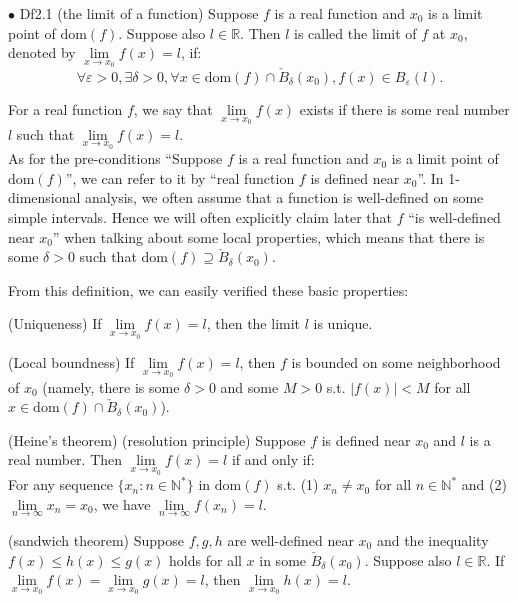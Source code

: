 \documentclass{article}
\begin{document}
\begin{Df}{$\bullet$ Df2.1 (the limit of a function)}
    Suppose $f$ is a real function and $x_0$ is a limit point of $\text{dom}(f)$. Suppose also $l\in\mathbb{R}$. Then $l$ is called the limit of $f$ at $x_0$, denoted by $\lim\limits_{x\rightarrow x_0}f(x) = l$, if:
    $$\forall\varepsilon>0, \exists\delta>0, \forall x\in\text{dom}(f)\cap\check{B}_\delta(x_0), f(x)\in B_\varepsilon(l).$$
\end{Df}

\begin{Rmk}{}
    \textcolor{Df}{For a real function $f$, we say that $\lim\limits_{x\to x_0} f(x)$ exists if there is some real number $l$ such that $\lim\limits_{x\to x_0} f(x) = l$.}\\
    \textcolor{Df}{As for the pre-conditions ``Suppose $f$ is a real function and $x_0$ is a limit point of $\text{dom}(f)$'', we can refer to it by ``real function $f$ is defined near $x_0$''.} In 1-dimensional analysis, we often assume that a function is well-defined on some simple intervals. \textcolor{Df}{Hence we will often explicitly claim later that $f$ ``is well-defined near $x_0$'' when talking about some local properties, which means that there is some $\delta>0$ such that $\text{dom}(f)\supseteq \check{B}_\delta(x_0)$.}\\
    \textcolor{Th}{From this definition, we can easily verified these basic properties:
    \begin{compactenum}
        \item (Uniqueness) If $\lim\limits_{x\rightarrow x_0}f(x) = l$, then the limit $l$ is unique.
        \item (Local boundness) If $\lim\limits_{x\rightarrow x_0}f(x) = l$, then $f$ is bounded on some neighborhood of $x_0$ (namely, there is some $\delta>0$ and some $M>0$ s.t. $|f(x)|<M$ for all $x\in\text{dom}(f)\cap\check{B}_\delta(x_0)$).
        \item (Heine's theorem) (resolution principle) Suppose $f$ is defined near $x_0$ and $l$ is a real number. Then $\lim\limits_{x\rightarrow x_0}f(x) = l$ if and only if:\\
        For any sequence $\{x_n:n\in\mathbb{N^\ast}\}$ in $\text{dom}(f)$ s.t. (1) $x_n\neq x_0$ for all $n\in\mathbb{N^\ast}$ and (2) $\lim\limits_{n\rightarrow\infty}x_n = x_0$, we have $\lim\limits_{n\rightarrow\infty}f(x_n) = l$.
        \item (sandwich theorem) Suppose $f, g, h$ are well-defined near $x_0$ and the inequality $f(x)\leq h(x)\leq g(x)$ holds for all $x$ in some $\check{B}_\delta(x_0)$. Suppose also $l\in\mathbb{R}$. If $\lim\limits_{x\to x_0} f(x) = \lim\limits_{x\to x_0} g(x) = l$, then $\lim\limits_{x\to x_0} h(x) = l$.

\end{compactenum}}
\end{Rmk}
\end{document}
